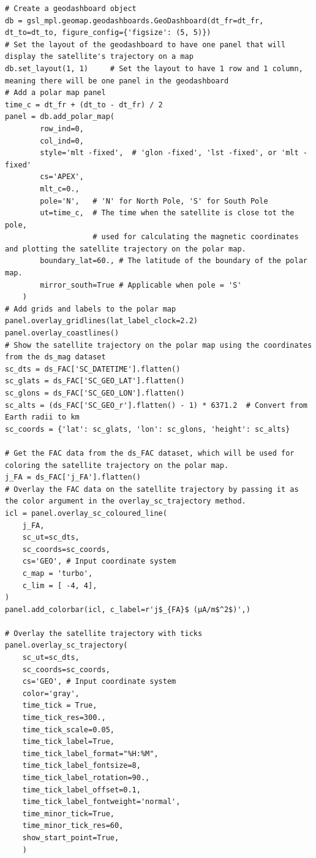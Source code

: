 \begin{verbatim}
# Create a geodashboard object
db = gsl_mpl.geomap.geodashboards.GeoDashboard(dt_fr=dt_fr, dt_to=dt_to, figure_config={'figsize': (5, 5)})
# Set the layout of the geodashboard to have one panel that will display the satellite's trajectory on a map
db.set_layout(1, 1)     # Set the layout to have 1 row and 1 column, meaning there will be one panel in the geodashboard
# Add a polar map panel
time_c = dt_fr + (dt_to - dt_fr) / 2
panel = db.add_polar_map(
        row_ind=0, 
        col_ind=0, 
        style='mlt -fixed',  # 'glon -fixed', 'lst -fixed', or 'mlt -fixed'
        cs='APEX',
        mlt_c=0., 
        pole='N',   # 'N' for North Pole, 'S' for South Pole
        ut=time_c,  # The time when the satellite is close tot the pole, 
                    # used for calculating the magnetic coordinates and plotting the satellite trajectory on the polar map.
        boundary_lat=60., # The latitude of the boundary of the polar map. 
        mirror_south=True # Applicable when pole = 'S'
    )
# Add grids and labels to the polar map
panel.overlay_gridlines(lat_label_clock=2.2)
panel.overlay_coastlines()
# Show the satellite trajectory on the polar map using the coordinates from the ds_mag dataset
sc_dts = ds_FAC['SC_DATETIME'].flatten()
sc_glats = ds_FAC['SC_GEO_LAT'].flatten()
sc_glons = ds_FAC['SC_GEO_LON'].flatten()
sc_alts = (ds_FAC['SC_GEO_r'].flatten() - 1) * 6371.2  # Convert from Earth radii to km
sc_coords = {'lat': sc_glats, 'lon': sc_glons, 'height': sc_alts}

# Get the FAC data from the ds_FAC dataset, which will be used for coloring the satellite trajectory on the polar map.
j_FA = ds_FAC['j_FA'].flatten()
# Overlay the FAC data on the satellite trajectory by passing it as the color argument in the overlay_sc_trajectory method.
icl = panel.overlay_sc_coloured_line(
    j_FA,
    sc_ut=sc_dts, 
    sc_coords=sc_coords, 
    cs='GEO', # Input coordinate system
    c_map = 'turbo',
    c_lim = [ -4, 4],   
)
panel.add_colorbar(icl, c_label=r'j$_{FA}$ (µA/m$^2$)',)

# Overlay the satellite trajectory with ticks
panel.overlay_sc_trajectory(
    sc_ut=sc_dts, 
    sc_coords=sc_coords, 
    cs='GEO', # Input coordinate system
    color='gray',
    time_tick = True, 
    time_tick_res=300., 
    time_tick_scale=0.05,
    time_tick_label=True, 
    time_tick_label_format="%H:%M", 
    time_tick_label_fontsize=8,
    time_tick_label_rotation=90., 
    time_tick_label_offset=0.1, 
    time_tick_label_fontweight='normal',
    time_minor_tick=True, 
    time_minor_tick_res=60,
    show_start_point=True,
    )
\end{verbatim}

